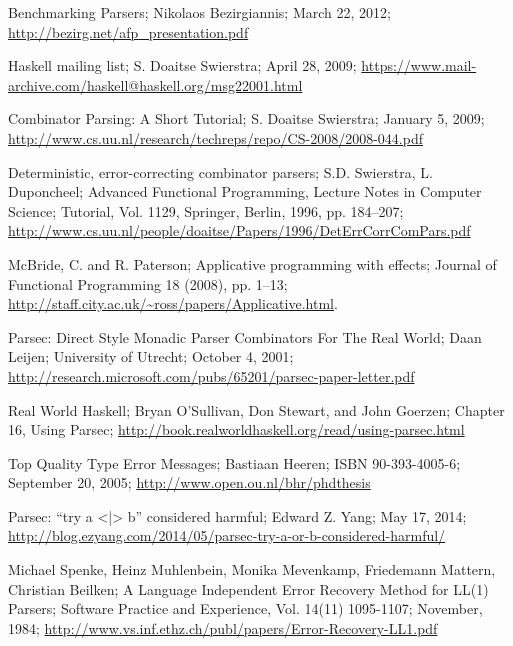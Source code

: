 \begin{thebibliography}{99}
\begin{multicols}{2}
	Benchmarking Parsers;
	Nikolaos Bezirgiannis;
	March 22, 2012;
	\url{http://bezirg.net/afp_presentation.pdf}

  Haskell mailing list;
  S. Doaitse Swierstra;
  April 28, 2009;
  \url{https://www.mail-archive.com/haskell@haskell.org/msg22001.html}

  Combinator Parsing: A Short Tutorial;
  S. Doaitse Swierstra;
  January 5, 2009;
  \url{http://www.cs.uu.nl/research/techreps/repo/CS-2008/2008-044.pdf}

	Deterministic, error-correcting combinator parsers;
	S.D. Swierstra, L. Duponcheel;
	Advanced Functional Programming, Lecture Notes in Computer Science;
	Tutorial, Vol. 1129, Springer, Berlin, 1996, pp. 184--207;
	\url{http://www.cs.uu.nl/people/doaitse/Papers/1996/DetErrCorrComPars.pdf}

  McBride, C. and R. Paterson;
  Applicative programming with effects;
  Journal of Functional Programming 18 (2008), pp. 1–13;
  \url{http://staff.city.ac.uk/~ross/papers/Applicative.html}.

	Parsec: Direct Style Monadic Parser Combinators For The Real World;
	Daan Leijen;
	University of Utrecht;
	October 4, 2001;
	\url{http://research.microsoft.com/pubs/65201/parsec-paper-letter.pdf}

	Real World Haskell;
	Bryan O'Sullivan, Don Stewart, and John Goerzen;
	Chapter 16, Using Parsec;
	\url{http://book.realworldhaskell.org/read/using-parsec.html}

	Top Quality Type Error Messages;
	Bastiaan Heeren;
	ISBN 90-393-4005-6;
	September 20, 2005;
	\url{http://www.open.ou.nl/bhr/phdthesis}

	Parsec: ``try a <|> b'' considered harmful;
	Edward Z. Yang;
	May 17, 2014;
	\url{http://blog.ezyang.com/2014/05/parsec-try-a-or-b-considered-harmful/}

	Michael Spenke, Heinz Muhlenbein, Monika Mevenkamp, Friedemann Mattern, Christian Beilken;
	A Language Independent Error Recovery Method for LL(1) Parsers;
	Software Practice and Experience, Vol. 14(11) 1095-1107;
	November, 1984;
	\url{http://www.vs.inf.ethz.ch/publ/papers/Error-Recovery-LL1.pdf}


\end{multicols}

\end{thebibliography}